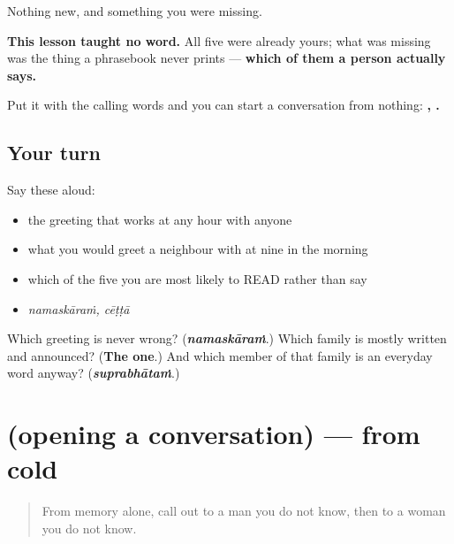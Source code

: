 \begin{grammarlens}[title={What you've built}]
Nothing new, and something you were missing.

\textbf{This lesson taught no word.} All five were already yours; what was missing was the thing a phrasebook never prints — \textbf{which of them a person actually says.}

Put it with the calling words and you can start a conversation from nothing: \textbf{, .}
\end{grammarlens}

\subsection*{Your turn}
Say these aloud:

\begin{itemize}
\raggedright
  \item the greeting that works at any hour with anyone
  \item what you would greet a neighbour with at nine in the morning
  \item which of the five you are most likely to READ rather than say
  \item \emph{namaskāraṁ, cēṭṭā}
\end{itemize}

\begin{tcolorbox}[breakable,colback=teal!4,colframe=teal!35!black,title={Before you move on}]
Which greeting is never wrong? (\emph{\textbf{namaskāraṁ}}.) Which family is mostly written and announced? (\textbf{The  one}.) And which member of that family is an everyday word anyway? (\emph{\textbf{suprabhātaṁ}}.)
\end{tcolorbox}
\section[(opening a conversation)]{(opening a conversation) — from cold}

\label{lesson:ML-R82-address-recall}



\begin{quote}
From memory alone, call out to a man you do not know, then to a woman you do not know.
\end{quote}

